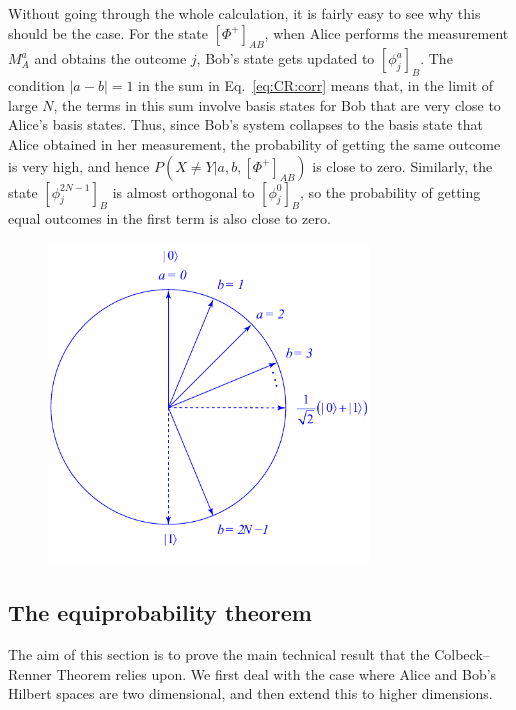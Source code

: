 \documentclass[DIV=calc,paper=a4,fontsize=11pt,twocolumn]{scrartcl} %
\theoremstyle{definition}
\theoremstyle{plain}
\newcommand{\Proj}[1]{\ensuremath{\left [ #1 \right ]}}
\begin{document}
Without going through the whole calculation, it is fairly easy to see
why this should be the case.  For the state $\Proj{\Phi^+}_{AB}$, when
Alice performs the measurement $M_A^a$ and obtains the outcome $j$,
Bob's state gets updated to $\Proj{\phi^a_j}_B$.  The condition $|a-b|
= 1$ in the sum in Eq.~\eqref{eq:CR:corr} means that, in the limit of
large $N$, the terms in this sum involve basis states for Bob that are
very close to Alice's basis states.  Thus, since Bob's system
collapses to the basis state that Alice obtained in her measurement,
the probability of getting the same outcome is very high, and hence
$P(X \neq Y|a,b,\Proj{\Phi^+}_{AB})$ is close to zero.  Similarly, the
state $\Proj{\phi_j^{2N-1}}_B$ is almost orthogonal to
$\Proj{\phi_j^{0}}_B$, so the probability of getting equal outcomes in
the first term is also close to zero.
\begin{figure}[t!]
\centering
\includegraphics[width=85mm]{Fig15.pdf}
\caption{}
\end{figure}

\subsection{The equiprobability theorem}

\label{CR:Equi}

The aim of this section is to prove the main technical result that the
Colbeck--Renner Theorem relies upon.  We first deal with the case where
Alice and Bob's Hilbert spaces are two dimensional, and then extend
this to higher dimensions.
\end{document}
